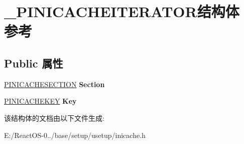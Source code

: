 \hypertarget{struct___p_i_n_i_c_a_c_h_e_i_t_e_r_a_t_o_r}{}\section{\+\_\+\+P\+I\+N\+I\+C\+A\+C\+H\+E\+I\+T\+E\+R\+A\+T\+O\+R结构体 参考}
\label{struct___p_i_n_i_c_a_c_h_e_i_t_e_r_a_t_o_r}
\subsection*{Public 属性}
\begin{DoxyCompactItemize}
\item 
\mbox{\label{struct___p_i_n_i_c_a_c_h_e_i_t_e_r_a_t_o_r_a21bc8062a89badcefbd5da75ef11c49d}} 
\hyperlink{struct___i_n_i_c_a_c_h_e_s_e_c_t_i_o_n}{P\+I\+N\+I\+C\+A\+C\+H\+E\+S\+E\+C\+T\+I\+ON} {\bfseries Section}
\item 
\mbox{\label{struct___p_i_n_i_c_a_c_h_e_i_t_e_r_a_t_o_r_a8aa0e6e4edd885441715a9cffa628042}} 
\hyperlink{struct___i_n_i_c_a_c_h_e_k_e_y}{P\+I\+N\+I\+C\+A\+C\+H\+E\+K\+EY} {\bfseries Key}
\end{DoxyCompactItemize}


该结构体的文档由以下文件生成\+:\begin{DoxyCompactItemize}
\item 
E\+:/\+React\+O\+S-\/0../base/setup/usetup/inicache.\+h\end{DoxyCompactItemize}
